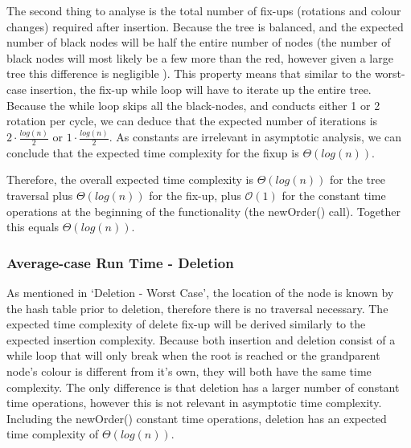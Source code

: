 \documentclass[11p]{article}
\begin{document}
The second thing to analyse is the total number of fix-ups (rotations and colour changes) required after insertion. Because the tree is balanced, and the expected number of black nodes will be half the entire number of nodes (the number of black nodes will most likely be a few more than the red, however given a large tree this difference is negligible ). This property means that similar to the worst-case insertion, the fix-up while loop will have to iterate up the entire tree. Because the while loop skips all the black-nodes, and conducts either 1 or 2 rotation per cycle, we can deduce that the expected number of iterations is $2 \cdot \frac{log(n)}{2}$ or $1 \cdot \frac{log(n)}{2}$. As constants are irrelevant in asymptotic analysis, we can conclude that the expected time complexity for the fixup is $\Theta(log(n))$. \bigbreak

Therefore, the overall expected time complexity is $\Theta(log(n))$ for the tree traversal plus $\Theta(log(n))$ for the fix-up, plus $\mathcal{O}(1)$ for the constant time operations at the beginning of the functionality (the newOrder() call). Together this equals $\Theta(log(n))$. 


\subsubsection{Average-case Run Time - Deletion}
As mentioned in `Deletion - Worst Case', the location of the node is known by the hash table prior to deletion, therefore there is no traversal necessary. The expected time complexity of delete fix-up will be derived similarly to the expected insertion complexity. Because both insertion and deletion consist of a while loop that will only break when the root is reached or the grandparent node's colour is different from it's own, they will both have the same time complexity. The only difference is that deletion has a larger number of constant time operations, however this is not relevant in asymptotic time complexity. Including the newOrder() constant time operations, deletion has an expected time complexity of $\Theta(log(n))$.
\end{document}
